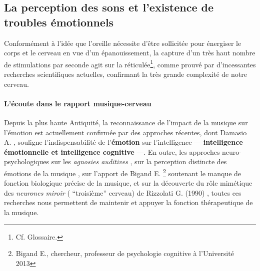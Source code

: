 \subsection{La perception des sons et l'existence de troubles
  émotionnels}


Conformément à l'idée que l'oreille nécessite d'être sollicitée pour
énergiser le corps et le cerveau en vue d'un épanouissement, la
capture d'un très haut nombre de stimulations par seconde agit
sur la \gls{réticulée}\footnote {Cf. Glossaire.},
comme prouvé par d'incessantes recherches scientifiques actuelles,
confirmant la très grande complexité de notre cerveau.








\paragraph{ L'écoute dans le rapport
  musique-cerveau}

Depuis la plus haute Antiquité,  la reconnaissance de
l'impact de la musique sur l'émotion est actuellement confirmée par
des approches récentes, dont Damasio A. \autocite {damasio:lautre},
souligne l'indispensabilité de l'\textbf{émotion}
sur l'intelligence   ---     \textbf{intelligence émotionnelle et intelligence
  cognitive} ---.
En outre, les approches neuro-psychologiques sur les \textit{agnosies
  auditives} \autocite[ pp. 205--216]{seron.baron.ea:neuropsychologie},
sur la perception distincte des émotions de la musique
\autocite[pp. 223--224]{platel_neuropsychology_2002},
sur l'apport de Bigand E. \autocite {bigand:cerveau}\footnote {Bigand E., chercheur, professeur
de psychologie cognitive à l'Université 2013 } soutenant le
manque de fonction biologique précise de la musique,
et sur la
découverte du rôle mimétique des\textit{ neurones miroir }( ``troisième''
cerveau) de Rizzolati G. (1990)
\autocite[118--119]{van_eersel_cerveau},
toutes ces recherches nous permettent de maintenir et
appuyer
la fonction thérapeutique de la musique.











